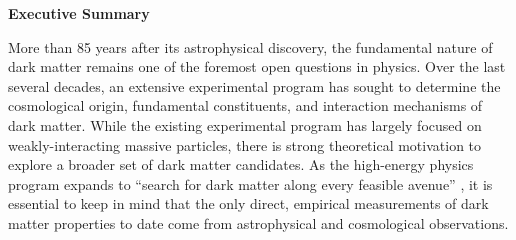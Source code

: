 \begin{comment}

\begin{center}
  {\Large \bf Abstract}
\end{center}
Astrophysical and cosmological observations currently provide the only robust, empirical measurements of dark matter. Future observations with Large Synoptic Survey Telescope (LSST) will provide necessary guidance for the experimental dark matter program. This white paper summarizes a community effort to assemble the science case for studying the fundamental physics of dark matter with LSST. We discuss how LSST will inform our understanding of the fundamental properties of dark matter, such as particle mass, self-interaction strength, non-gravitational couplings to the Standard Model, and compact object abundances. Additionally, we discuss the ways that LSST will complement other experiments to strengthen our understanding of the fundamental characteristics of dark matter. More information on the LSST dark matter effort can be found at https://lsstdarkmatter.github.io/.

\clearpage
\end{comment}


\begin{center}
  {\Large \bf Executive Summary}
\end{center}

More than 85 years after its astrophysical discovery, the fundamental nature of dark matter remains one of the foremost open questions in physics.
Over the last several decades, an extensive experimental program has sought to determine the cosmological origin, fundamental constituents, and interaction mechanisms of dark matter. 
While the existing experimental program has largely focused on weakly-interacting massive particles, there is strong theoretical motivation to explore a broader set of dark matter candidates.
As the high-energy physics program expands to ``search for dark matter along every feasible avenue'' \citep{P5Report}, it is essential to keep in mind that the only direct, empirical measurements of dark matter properties to date come from astrophysical and cosmological observations.


